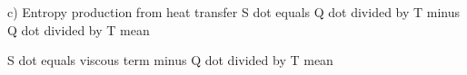 c) Entropy production from heat transfer  
S dot equals Q dot divided by T minus Q dot divided by T mean  

S dot equals viscous term minus Q dot divided by T mean